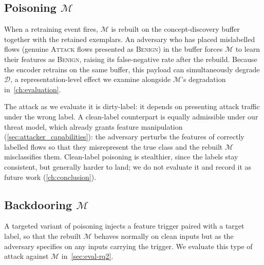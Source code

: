 \subsection{Poisoning \texorpdfstring{$\mathcal{M}$}{M}}
\label{sec:axt-poison-m}
When a retraining event fires, $\mathcal{M}$ is rebuilt on the concept-discovery buffer together with the retained exemplars. An adversary who has placed mislabelled flows (genuine \textsc{Attack} flows presented as \textsc{Benign}) in the buffer forces $\mathcal{M}$ to learn their features as \textsc{Benign}, raising its false-negative rate after the rebuild. Because the encoder retrains on the same buffer, this payload can simultaneously degrade $\mathcal{D}$, a representation-level effect we examine alongside $\mathcal{M}$'s degradation in~\cref{ch:evaluation}.

The attack as we evaluate it is dirty-label: it depends on presenting attack traffic under the wrong label. A clean-label counterpart is equally admissible under our threat model, which already grants feature manipulation (\cref{sec:attacker_capabilities}): the adversary perturbs the features of correctly labelled flows so that they misrepresent the true class and the rebuilt $\mathcal{M}$ misclassifies them. Clean-label poisoning is stealthier, since the labels stay consistent, but generally harder to land; we do not evaluate it and record it as future work (\cref{ch:conclusion}).

\subsection{Backdooring \texorpdfstring{$\mathcal{M}$}{M}}
\label{sec:axt-backdoor-m}
A targeted variant of poisoning injects a feature trigger paired with a target label, so that the rebuilt $\mathcal{M}$ behaves normally on clean inputs but as the adversary specifies on any inputs carrying the trigger. We evaluate this type of attack against $\mathcal{M}$ in~\cref{sec:eval-rq2}.

